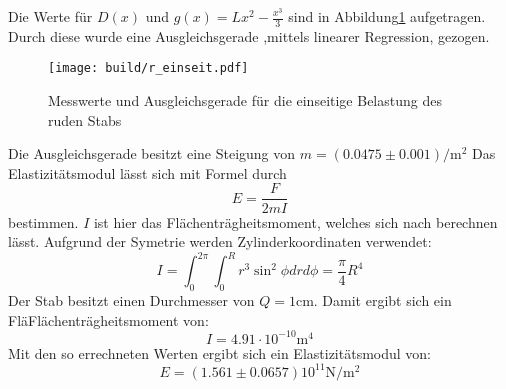 Die Werte für $D(x)$ und $g(x)=Lx^2-\frac{x^3}{3}$ sind in Abbildung\ref{fig:plot1} aufgetragen.
Durch diese wurde eine Ausgleichsgerade ,mittels linearer Regression, gezogen.
\begin{figure}
    \centering
    \texttt{[image: build/r\_einseit.pdf]}
    \caption{Messwerte und Ausgleichsgerade für die einseitige Belastung des ruden Stabs}
    \label{fig:plot1}
\end{figure}

Die Ausgleichsgerade besitzt eine Steigung von $m=(0.0475\pm 0.001)\si{\per\meter\squared}$
Das Elastizitätsmodul lässt sich mit Formel durch
\begin{equation}
  E=\frac{F}{2mI}
\end{equation}
bestimmen.
$I$ ist hier das Flächenträgheitsmoment, welches sich nach berechnen lässt.
Aufgrund der Symetrie werden Zylinderkoordinaten verwendet:
\begin{equation}
  I=\int_0^{2\pi} \int_0^R r^3 \sin^2{\phi} dr d\phi=\frac{\pi}{4}R^4
\end{equation}
Der Stab besitzt einen Durchmesser von $Q=1\si{\centi\meter}$.
Damit ergibt sich ein FläFlächenträgheitsmoment von:
\begin{equation*}
  I=4.91\cdot 10^{-10} \si{\meter}^4
\end{equation*}
Mit den so errechneten Werten ergibt sich ein Elastizitätsmodul von:
\begin{equation*}
  E=(1.561\pm0.0657)10^{11}\si{\newton\per\meter\squared}
\end{equation*}
